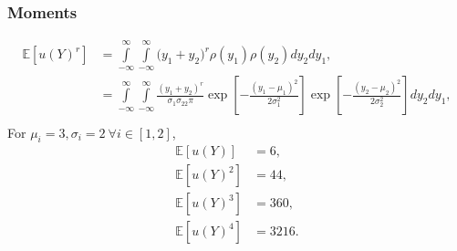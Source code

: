 \documentclass[11pt]{article}
\newcommand{\expv}[1]{\ensuremath{\mathbb{E}[ #1]}}
\newcommand{\intf}{\ensuremath{\int\limits_{-\infty}^\infty}}
\begin{document}
\subsubsection{Moments}
\begin{align}
\expv{u(Y)^r}&=\intf\intf\Big(y_1+y_2\Big)^r\rho(y_1)\rho(y_2) dy_2 dy_1,\\
  &=\intf\intf\frac{(y_1+y_2)^r}{\sigma_1\sigma_22\pi}\exp[-\frac{(y_1-\mu_1)^2}{2\sigma_1^2}]\exp[-\frac{(y_2-\mu_2)^2}{2\sigma_2^2}]dy_2 dy_1,\\
\end{align}
For $\mu_i=3,\sigma_i=2\ \forall i\in[1,2]$,
\begin{align}
  \expv{u(Y)} &= 6,\\
  \expv{u(Y)^2} &=44,\\
  \expv{u(Y)^3} &=360,\\
  \expv{u(Y)^4} &=3216.
\end{align}
\end{document}
